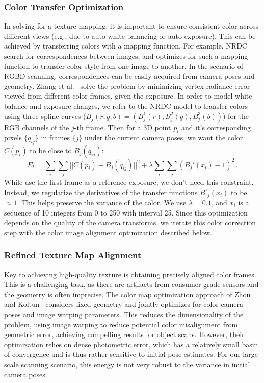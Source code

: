 \subsubsection{Color Transfer Optimization}
\label{subsec:3dlite-color-transfer}
In solving for a texture mapping, it is important to ensure consistent color across different views (e.g., due to auto-white balancing or auto-exposure).
This can be achieved by transferring colors with a mapping function.
For example, NRDC~\cite{hacohen2011non} search for correspondences between images, and optimizes for such a mapping function to transfer color style from one image to another.
In the scenario of RGBD scanning, correspondences can be easily acquired from camera poses and geometry. 
Zhang et al.~\cite{zhang2016emptying} solve the problem by minimizing vertex radiance error viewed from different color frames, given the exposure. 
In order to model white balance and exposure changes, we refer to the NRDC model to transfer colors using three spline curves ($B_j(r,g,b)=(B^1_j(r),B^2_j(g),B^3_j(b))$) for the RGB channels of the $j$-th frame. 
Then for a 3D point $p_i$ and it's corresponding pixels $\{q_{ij}\}$ in frames $\{j\}$ under the current camera poses, we want the color $C(p_i)$ to be close to $B_j(q_{ij})$:
\begin{equation}
E_t = \sum_{i} \sum_{j} ||C(p_i) - B_j(q_{ij})||^2 + \lambda \sum_{i} \sum_{j} (B_j'(x_i)-1)^2\,.
\end{equation}
While \cite{zhang2016emptying} use the first frame as a reference exposure, we don't need this constraint. 
Instead, we regularize the derivatives of the transfer functions $B'_j(x_i)$ to be $\approx 1$. 
This helps preserve the variance of the color. 
We use $\lambda = 0.1$, and $x_i$ is a sequence of 10 integers from 0 to 250 with interval 25.
Since this optimization depends on the quality of the camera transforms, we iterate this color correction step with the color image alignment optimization described below.

\subsubsection{Refined Texture Map Alignment}
\label{subsec:3dlite-color-align}
Key to achieving high-quality texture is obtaining precisely aligned color frames.
This is a challenging task, as there are artifacts from consumer-grade sensors and the geometry is often imprecise.
The color map optimization approach of Zhou and Koltun~\cite{zhou2014color} considers fixed geometry and jointly optimizes for color camera poses and image warping parameters.
This reduces the dimensionality of the problem, using image warping to reduce potential color misalignment from geometric error, achieving compelling results for object scans.
However, their optimization relies on dense photometric error, which has a relatively small basin of convergence and is thus rather sensitive to initial pose estimates.
For our large-scale scanning scenario, this energy is not very robust to the variance in initial camera poses.

